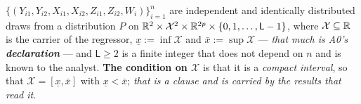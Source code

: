 
\begin{assumption}[A0: Sampling]\label{ass:sampling}
$\{(Y_{i1},Y_{i2},X_{i1},X_{i2},Z_{i1},Z_{i2},W_i)\}_{i=1}^{n}$ are independent and identically
distributed draws from a distribution $P$ on
$\mathbb{R}^{2}\times\mathcal X^{2}\times\mathbb{R}^{2p}\times\{0,1,\dots,\mathsf L-1\}$, where
$\mathcal X\subseteq\mathbb{R}$ is the carrier of the regressor, $\underline x:=\inf\mathcal X$ and
$\bar x:=\sup\mathcal X$ --- \emph{that much is A0's \textbf{declaration}} --- and $\mathsf L\ge2$ is a
finite integer that does not depend on $n$ and is known to the analyst. \textbf{The condition on
$\mathcal X$} is that it is a \emph{compact interval}, so that $\mathcal X=[\underline x,\bar x]$ with
$\underline x<\bar x$; \emph{that is a clause and is carried by the results that read it}.
\end{assumption}

